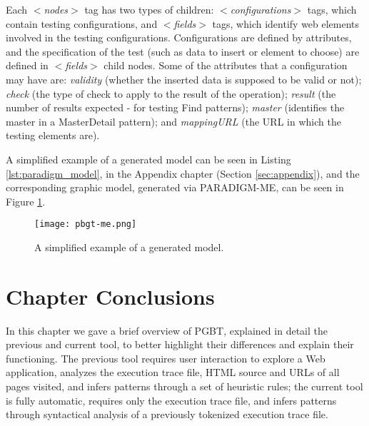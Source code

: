 Each $<$\textit{nodes}$>$ tag has two types of children: $<$\textit{configurations}$>$ tags, which contain testing configurations, and $<$\textit{fields}$>$ tags, which identify web elements involved in the testing configurations. Configurations are defined by attributes, and the specification of the test (such as data to insert or element to choose) are defined in $<$\textit{fields}$>$ child nodes. Some of the attributes that a configuration may have are: \textit{validity} (whether the inserted data is supposed to be valid or not); \textit{check} (the type of check to apply to the result of the operation); \textit{result} (the number of results expected - for testing Find patterns); \textit{master} (identifies the master in a MasterDetail pattern); and \textit{mappingURL} (the URL in which the testing elements are).

A simplified example of a generated model can be seen in Listing \ref{lst:paradigm_model}, in the Appendix chapter (Section \ref{sec:appendix}), and the corresponding graphic model, generated via PARADIGM-ME, can be seen in Figure \ref{fig:pbgt-me}.

\begin{center}
\begin{figure}[!htb]
\centering
\texttt{[image: pbgt-me.png]}
\caption{A simplified example of a generated model.}
\label{fig:pbgt-me}
\end{figure}
\end{center}

\section{Chapter Conclusions}
In this chapter we gave a brief overview of PGBT, explained in detail the previous and current tool, to better highlight their differences and explain their functioning. The previous tool requires user interaction to explore a Web application, analyzes the execution trace file, HTML source and URLs  of all pages visited, and infers patterns through a set of heuristic rules; the current tool is fully automatic, requires only the execution trace file, and infers patterns through syntactical analysis of a previously tokenized execution trace file.

